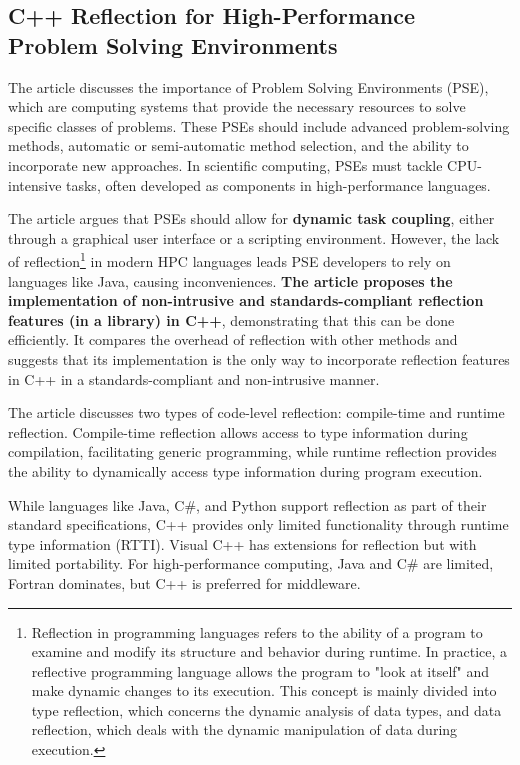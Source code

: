 \documentclass[11pt]{article}
\begin{document}
\begin{multicols*}{2}[\columnsep=1cm]
    \section{C++ Reflection for High-Performance Problem Solving Environments}
    The article discusses the importance of Problem Solving Environments (PSE), which are computing systems that provide the necessary resources to solve specific classes of problems. These PSEs should include advanced problem-solving methods, automatic or semi-automatic method selection, and the ability to incorporate new approaches. In scientific computing, PSEs must tackle CPU-intensive tasks, often developed as components in high-performance languages.
    
    The article argues that PSEs should allow for \textbf{dynamic task coupling}, either through a graphical user interface or a scripting environment. However, the lack of reflection\footnote{Reflection in programming languages refers to the ability of a program to examine and modify its structure and behavior during runtime. In practice, a reflective programming language allows the program to "look at itself" and make dynamic changes to its execution. This concept is mainly divided into type reflection, which concerns the dynamic analysis of data types, and data reflection, which deals with the dynamic manipulation of data during execution.} in modern HPC languages leads PSE developers to rely on languages like Java, causing inconveniences.
    \textbf{The article proposes the implementation of non-intrusive and standards-compliant reflection features (in a library) in C++}, demonstrating that this can be done efficiently. It compares the overhead of reflection with other methods and suggests that its implementation is the only way to incorporate reflection features in C++ in a standards-compliant and non-intrusive manner.
    
    The article discusses two types of code-level reflection: compile-time and runtime reflection. Compile-time reflection allows access to type information during compilation, facilitating generic programming, while runtime reflection provides the ability to dynamically access type information during program execution.
    
    While languages like Java, C\#, and Python support reflection as part of their standard specifications, C++ provides only limited functionality through runtime type information (RTTI). Visual C++ has extensions for reflection but with limited portability. For high-performance computing, Java and C\# are limited, Fortran dominates, but C++ is preferred for middleware.
    

\end{multicols*}
\end{document}
